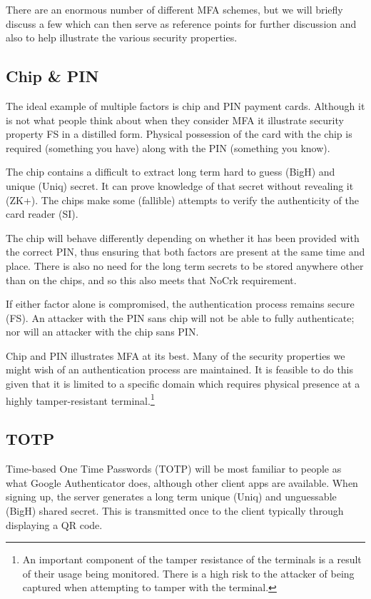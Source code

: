\documentclass[12pt]{article}
\newcommand{\prop}[1]{\textsf{#1}}
\begin{document}
There are an enormous number of different MFA schemes,
but we will briefly discuss a few
which can then serve as reference points for further discussion and also to help illustrate the various security properties.

\subsection{Chip \& PIN}

The ideal example of multiple factors is chip and PIN payment cards. Although it is not what people think about when they consider MFA it illustrate security property \prop{FS} in a distilled form.
Physical possession of the card with the chip is required (something you have) along with the PIN (something you know).

The chip contains a difficult to extract long term hard to guess (\prop{BigH}) and unique (\prop{Uniq}) secret. It can prove knowledge of that secret without revealing it (\prop{ZK+}). The chips make some (fallible) attempts to verify the authenticity of the card reader (\prop{SI}).

The chip will behave differently depending on whether it has been provided with the correct PIN, thus ensuring that both factors are present at the same time and place. There is also no need for the long term secrets to be stored anywhere other than on the chips, and so this also meets that \prop{NoCrk} requirement.

If either factor alone is compromised, the authentication process remains secure (\prop{FS}).
An attacker with the PIN sans chip will not be able to fully authenticate; nor will an attacker with the chip sans PIN\@.


Chip and PIN illustrates MFA at its best. Many of the security properties we might wish of an authentication process are maintained. It is feasible to do this given that it is limited to a specific domain which requires physical presence at a highly tamper-resistant terminal.\footnote{An important component of the tamper resistance of the terminals is a result of their usage being monitored. There is a high risk to the attacker of being captured when attempting to tamper with the terminal.}

\subsection{TOTP}\label{sec:totp}

Time-based One Time Passwords (TOTP) will be most familiar to people as what Google Authenticator does, although other client apps are available.
When signing up, the server generates a long term unique (\prop{Uniq}) and unguessable (\prop{BigH}) shared secret. This is transmitted once to the client typically through displaying a QR code. 
\end{document}
